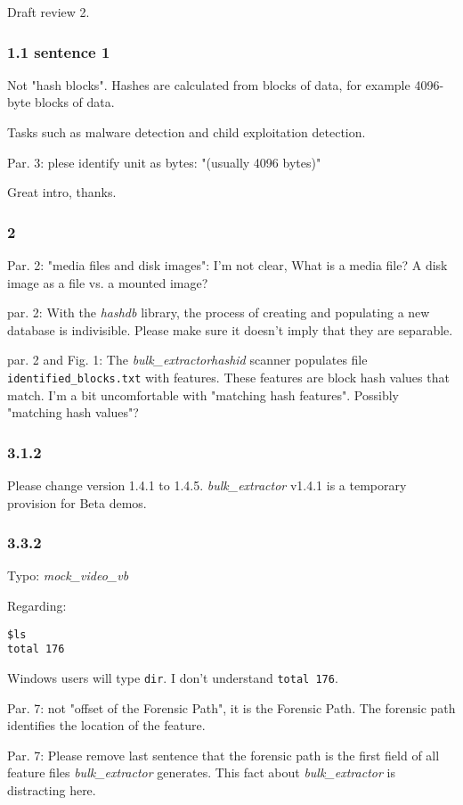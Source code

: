 \documentclass[12pt,twoside]{article}
\newcommand{\hdb}{\emph{hashdb}\xspace}
\newcommand{\bulk}{\emph{bulk\_extractor}\xspace}
\newcommand{\hid}{\emph{hashid}\xspace}
\begin{document}
Draft review 2.

\subsubsection*{1.1 sentence 1}
Not "hash blocks".  Hashes are calculated from blocks of data,
for example 4096-byte blocks of data.

Tasks such as malware detection
and child exploitation detection.

Par. 3: plese identify unit as bytes: "(usually 4096 bytes)"

Great intro, thanks.


\subsubsection*{2}
Par. 2: "media files and disk images": I'm not clear, What is a media file?
A disk image as a file vs. a mounted image?

par. 2: With the \hdb library,
the process of creating and populating a new database is indivisible.
Please make sure it doesn't imply that they are separable.

par. 2 and Fig. 1:
The \bulk \hid scanner populates file \texttt{identified\_blocks.txt}
with features.  These features are block hash values that match.
I'm a bit uncomfortable with "matching hash features".
Possibly "matching hash values"?

\subsubsection*{3.1.2}
Please change version 1.4.1 to 1.4.5.
\bulk v1.4.1 is a temporary provision for Beta demos.

\subsubsection*{3.3.2}
Typo: \textit{mock\_video\_vb}

Regarding:
\begin{verbatim}
$ls
total 176
\end{verbatim}
Windows users will type \texttt{dir}.
I don't understand \texttt{total 176}.

Par. 7: not "offset of the Forensic Path", it is the Forensic Path.
The forensic path identifies the location of the feature.

Par. 7: Please remove last sentence
that the forensic path is the first field of all feature files
\bulk generates.
This fact about \bulk is distracting here.
\end{document}
